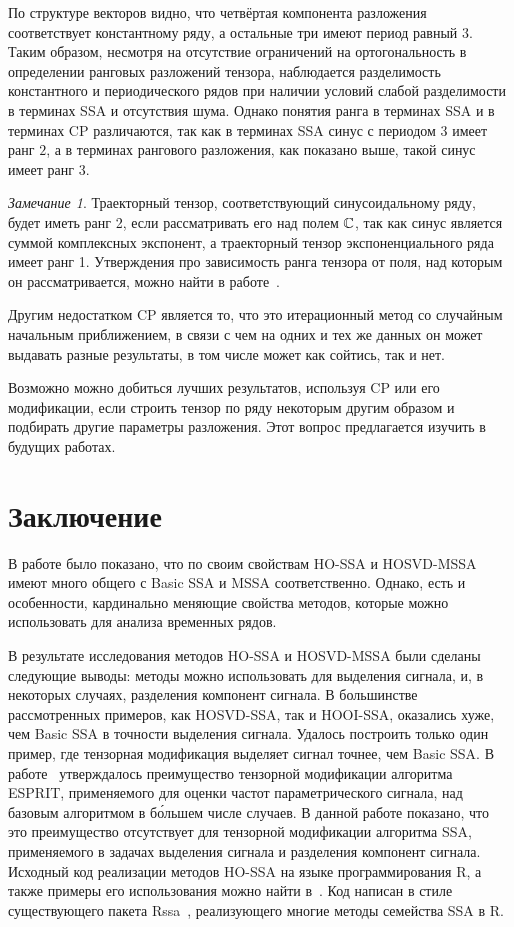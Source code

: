 \documentclass[specialist,
    substylefile = spbu.rtx,
    subf,href,colorlinks=true, 12pt]{disser}
\theoremstyle{plain}
\theoremstyle{definition}
\theoremstyle{remark}
\newtheorem*{remark}{Замечание}
\begin{document}
    По структуре векторов видно, что четвёртая компонента разложения соответствует константному ряду, а остальные три имеют период равный $3$.
    Таким образом, несмотря на отсутствие ограничений на ортогональность в определении ранговых разложений тензора, наблюдается
    разделимость константного и периодического рядов при наличии условий слабой разделимости в терминах SSA и отсутствия
    шума.
    Однако понятия ранга в терминах SSA и в терминах CP различаются, так как в терминах SSA синус с периодом $3$ имеет ранг $2$, а в
    терминах рангового разложения, как показано выше, такой синус имеет ранг $3$.
    \begin{remark}
        Траекторный тензор, соответствующий синусоидальному ряду, будет иметь ранг 2, если рассматривать его
        над полем $\mathbb{C}$, так как синус является суммой комплексных экспонент, а траекторный тензор экспоненциального
        ряда имеет ранг 1.
        Утверждения про зависимость ранга тензора от поля, над которым он рассматривается, можно найти в
        работе~\cite{tensors-bg}.
    \end{remark}

    Другим недостатком CP является то, что это итерационный метод со случайным начальным приближением, в связи
    с чем на одних и тех же данных он может выдавать разные результаты, в том числе может как сойтись, так и нет.

    Возможно можно добиться лучших результатов, используя CP или его модификации, если строить тензор по ряду
    некоторым другим образом и подбирать другие параметры разложения.
    Этот вопрос предлагается изучить в будущих работах.
    \newpage


    \section{Заключение}\label{sec:conclusion}
    В работе было показано, что по своим свойствам HO-SSA и HOSVD-MSSA имеют много общего
    с Basic SSA и MSSA соответственно.
    Однако, есть и особенности, кардинально меняющие свойства методов, которые можно использовать для анализа временных рядов.

    В результате исследования методов HO-SSA и HOSVD-MSSA были сделаны следующие выводы:
    методы можно использовать для выделения сигнала, и, в некоторых случаях, разделения компонент сигнала.
    В большинстве рассмотренных примеров, как HOSVD-SSA, так и HOOI-SSA, оказались хуже,
    чем Basic SSA в точности выделения сигнала.
    Удалось построить только один пример, где тензорная модификация выделяет сигнал точнее, чем Basic SSA.
    В работе~\cite{hosvd-hooi-separation} утверждалось преимущество тензорной модификации алгоритма
    ESPRIT, применяемого для оценки частот параметрического сигнала, над базовым алгоритмом в б\'{о}льшем числе случаев.
    В данной работе показано, что это преимущество отсутствует для тензорной модификации алгоритма SSA, применяемого в задачах выделения сигнала и разделения компонент сигнала.
    Исходный код реализации методов HO-SSA на языке программирования R, а также
    примеры его использования можно найти в~\cite{Rcode}.
    Код написан в стиле существующего пакета Rssa~\cite{Rssa}, реализующего многие методы семейства SSA в R.
\end{document}
